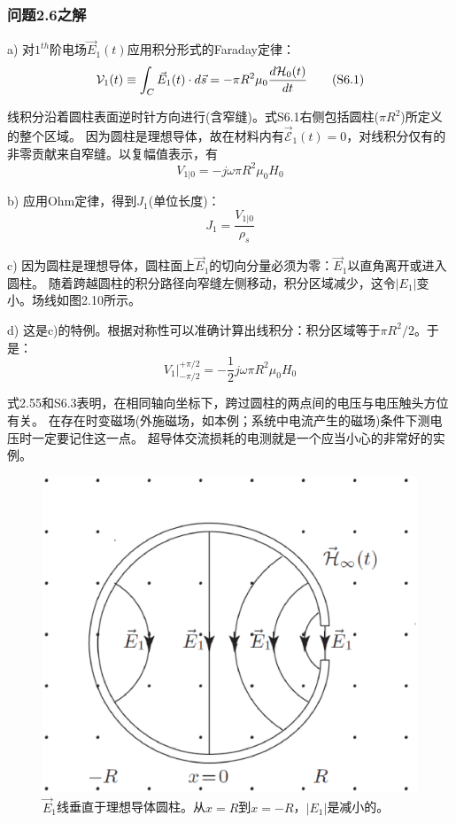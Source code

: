 \subsubsection*{问题2.6之解}
a) 对$1^{th}$阶电场$\vec{E}_1(t)$应用积分形式的Faraday定律：
\begin{equation*}
\CMcal{V}_1(t) \equiv \int_{C} \vec{E}_1 (t) \cdot d\vec{s}=-\pi R^2 \mu_0 \frac{d\CMcal{H}_0(t)}{dt} \tag{S6.1}
\end{equation*}

线积分沿着圆柱表面逆时针方向进行(含窄缝)。式S6.1右侧包括圆柱($\pi R^2$)所定义的整个区域。
因为圆柱是理想导体，故在材料内有$\vec{\mathcal{E}}_1(t)=0$，对线积分仅有的非零贡献来自窄缝。以复幅值表示，有
\begin{equation*}
V_{1|0}=-j\omega \pi R^2 \mu_0 H_0 \tag{2.55}
\end{equation*}

b) 应用Ohm定律，得到$J_1$(单位长度)：
\begin{equation*}
J_1=\frac{V_{1|0}}{\rho_s} \tag{S6.2}
\end{equation*}

c) 因为圆柱是理想导体，圆柱面上$\vec{E}_1$的切向分量必须为零：$\vec{E}_1$以直角离开或进入圆柱。
随着跨越圆柱的积分路径向窄缝左侧移动，积分区域减少，这令$|E_1|$变小。场线如图2.10所示。

d) 这是c)的特例。根据对称性可以准确计算出线积分：积分区域等于$\pi R^2/2$。于是：
\begin{equation*}
V_1 |_{-\pi/2}^{+\pi/2}=-\frac{1}{2}j\omega \pi R^2 \mu_0 H_0   \tag{S6.3}
\end{equation*}

式2.55和S6.3表明，在相同轴向坐标下，跨过圆柱的两点间的电压与电压触头方位有关。
在存在时变磁场(外施磁场，如本例；系统中电流产生的磁场)条件下测电压时一定要记住这一点。
超导体交流损耗的电测就是一个应当小心的非常好的实例。

\begin{figure}[htbp]
  \centering
 \includegraphics[scale=0.4]{chpt2/figs/fig2.10.eps}
  \caption{$\vec{E}_1$线垂直于理想导体圆柱。从$x=R$到$x=-R$，$|E_1|$是减小的。}
\end{figure}



